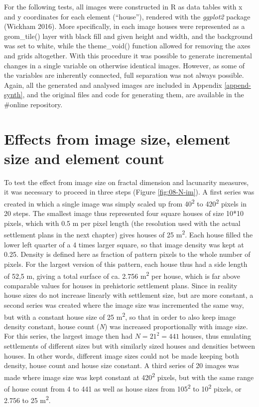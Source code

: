 \documentclass[
  12pt,
  a4paper, twoside]{book}
\begin{document}
For the following tests, all images were constructed in R as data tables with x and y coordinates for each element (``house''), rendered with the \emph{ggplot2} package (Wickham 2016). More specifically, in each image houses were represented as a geom\_tile() layer with black fill and given height and width, and the background was set to white, while the theme\_void() function allowed for removing the axes and grids altogether. With this procedure it was possible to generate incremental changes in a single variable on otherwise identical images. However, as some of the variables are inherently connected, full separation was not always possible. Again, all the generated and analysed images are included in Appendix \ref{append-synth}, and the original files and code for generating them, are available in the \#online repository.

\hypertarget{effects-from-image-size-element-size-and-element-count}{%
\section{Effects from image size, element size and element count}\label{effects-from-image-size-element-size-and-element-count}}

To test the effect from image size on fractal dimension and lacunarity measures, it was necessary to proceed in three steps (Figure \ref{fig:08-N-im}). A first series was created in which a single image was simply scaled up from 40\textsuperscript{2} to 420\textsuperscript{2} pixels in 20 steps. The smallest image thus represented four square houses of size 10*10 pixels, which with 0.5 m per pixel length (the resolution used with the actual settlement plans in the next chapter) gives houses of 25 m\textsuperscript{2}. Each house filled the lower left quarter of a 4 times larger square, so that image density was kept at 0.25. Density is defined here as fraction of pattern pixels to the whole number of pixels. For the largest version of this pattern, each house thus had a side length of 52,5 m, giving a total surface of ca. 2.756 m\textsuperscript{2} per house, which is far above comparable values for houses in prehistoric settlement plans. Since in reality house sizes do not increase linearly with settlement size, but are more constant, a second series was created where the image size was incremented the same way, but with a constant house size of 25 m\textsuperscript{2}, so that in order to also keep image density constant, house count (\emph{N}) was increased proportionally with image size. For this series, the largest image then had \(N = 21^2 = 441\) houses, thus emulating settlements of different sizes but with similarly sized houses and densities between houses. In other words, different image sizes could not be made keeping both density, house count and house size constant. A third series of 20 images was made where image size was kept constant at 420\textsuperscript{2} pixels, but with the same range of house count from 4 to 441 as well as house sizes from 105\textsuperscript{2} to 10\textsuperscript{2} pixels, or 2.756 to 25 m\textsuperscript{2}.
\end{document}
